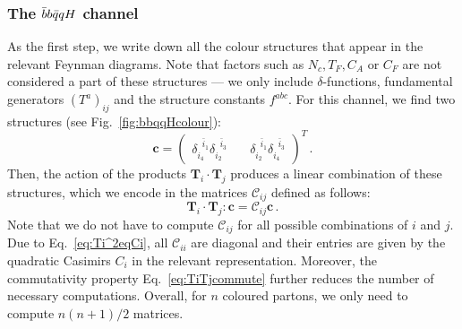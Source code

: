 \documentclass[main.tex]{subfiles}
\begin{document}
\subsubsection{The $\bar{b}b\bar{q}qH$ channel}
As the first step, we write down all the colour structures that appear in the relevant Feynman diagrams. Note that factors such as $N_c, T_F, C_A$ or $C_F$ are not considered a part of these structures --- we only include $\delta$-functions, fundamental generators $(T^a)_{ij}$ and the structure constants $f^{abc}$. For this channel, we find two structures (see Fig.~\ref{fig:bbqqHcolour}):
\begin{equation}
    \bm{c} = 
    \begin{pmatrix}
        \delta_{i_4}^{\;\;\bar{i}_1} \delta_{i_2}^{\;\;\bar{i}_3} & \quad \delta_{i_2}^{\;\;\bar{i}_1} \delta_{i_4}^{\;\;\bar{i}_3}
    \end{pmatrix}^T\,.
\end{equation}
Then, the action of the products $\bm{T}_i \cdot \bm{T}_j$ produces a linear combination of these structures, which we encode in the matrices $\mathcal{C}_{ij}$ defined as follows:
\begin{equation}
    \bm{T}_i \cdot \bm{T}_j :  \bm{c} = \mathcal{C}_{ij} \bm{c}\,.
\end{equation}
Note that we do not have to compute $\mathcal{C}_{ij}$ for all possible combinations of $i$ and $j$. Due to Eq.~\ref{eq:Ti^2eqCi}, all $\mathcal{C}_{ii}$ are diagonal and their entries are given by the quadratic Casimirs $C_i$ in the relevant representation. Moreover, the commutativity property Eq.~\ref{eq:TiTjcommute} further reduces the number of necessary computations. Overall, for $n$ coloured partons, we only need to compute $n(n+1)/2$ matrices.
\end{document}
